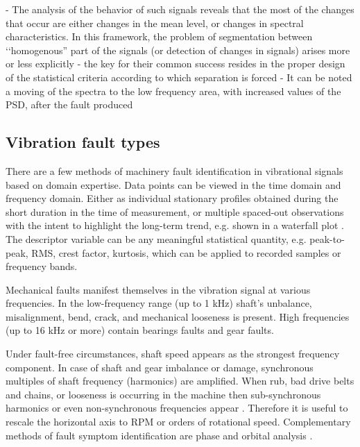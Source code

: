 \cite{popescu_blind_2010}
- The analysis of the behavior of such signals reveals that the most of the changes that occur are either changes in the mean level, or changes in spectral characteristics. In this framework, the problem of segmentation between ‘‘homogenous” part of the signals (or detection of changes in signals) arises more or less explicitly
- the key for their common success resides in the proper design of the statistical criteria according to which separation is forced
- It can be noted a moving of the spectra to the low frequency area, with increased values of the PSD, after the fault produced


\subsection{Vibration fault types}
There are a few methods of machinery fault identification in vibrational signals based on domain expertise. Data points can be viewed in the time domain and frequency domain. Either as individual stationary profiles obtained during the short duration in the time of measurement, or multiple spaced-out observations with the intent to highlight the long-term trend, e.g. shown in a waterfall plot \cite{ziaran_technicka_2013}. The descriptor variable can be any meaningful statistical quantity, e.g. peak-to-peak, RMS, crest factor, kurtosis, which can be applied to recorded samples or frequency bands.

Mechanical faults manifest themselves in the vibration signal at various frequencies. In the low-frequency range (up to 1 kHz) shaft's unbalance, misalignment, bend, crack, and mechanical looseness is present. High frequencies (up to 16 kHz or more) contain bearings faults and gear faults.

Under fault-free circumstances, shaft speed appears as the strongest frequency component. In case of shaft and gear imbalance or damage, synchronous multiples of shaft frequency (harmonics) are amplified. When rub, bad drive belts and chains, or looseness is occurring in the machine then sub-synchronous harmonics or even non-synchronous frequencies appear \cite{mohanty_machinery_2015}.  Therefore it is useful to rescale the horizontal axis to RPM or orders of rotational speed. Complementary methods of fault symptom identification are phase and orbital analysis \cite{scheffer_practical_2004}.

